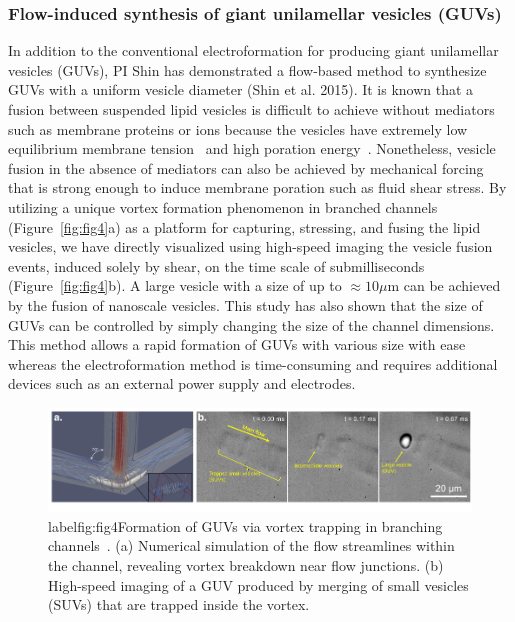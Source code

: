 \documentclass[11pt]{article}
\begin{document}
\subsubsection{Flow-induced synthesis of giant unilamellar vesicles (GUVs)\label{subsubsec:GUVs}}
In addition to the conventional electroformation for producing giant
unilamellar vesicles (GUVs), PI Shin has demonstrated a flow-based
method to synthesize GUVs with a uniform vesicle diameter (Shin et al.
2015).  It is known that a fusion between suspended lipid vesicles is
difficult to achieve without mediators such as membrane proteins or ions
because the vesicles have extremely low equilibrium membrane
tension~\cite{jahnig1996} and high poration energy~\cite{gao2008}.
Nonetheless, vesicle fusion in the absence of mediators can also be
achieved by mechanical forcing that is strong enough to induce membrane
poration such as fluid shear stress.  By utilizing a unique vortex
formation phenomenon in branched channels (Figure~\ref{fig:fig4}a) as a
platform for capturing, stressing, and fusing the lipid vesicles, we
have directly visualized using high-speed imaging the vesicle fusion
events, induced solely by shear, on the time scale of submilliseconds
(Figure~\ref{fig:fig4}b). A large vesicle with a size of up to $\approx
10\mu$m can be achieved by the fusion of nanoscale vesicles.  This study
has also shown that the size of GUVs can be controlled by simply
changing the size of the channel dimensions. This method allows a rapid
formation of GUVs with various size with ease whereas the
electroformation method is time-consuming and requires additional
devices such as an external power supply and electrodes.
%
\begin{figure}[h]
\begin{center}
\includegraphics*[keepaspectratio=true,scale=1]{figs/fig4.pdf}
  \caption{label{fig:fig4}Formation of GUVs via vortex trapping in
  branching channels~\cite{shin2015}. (a) Numerical simulation of the
  flow streamlines within the channel, revealing vortex breakdown near
  flow junctions.  (b) High-speed imaging of a GUV produced by merging
  of small vesicles (SUVs) that are trapped inside the vortex.}
\end{center}
\end{figure}
\end{document}
